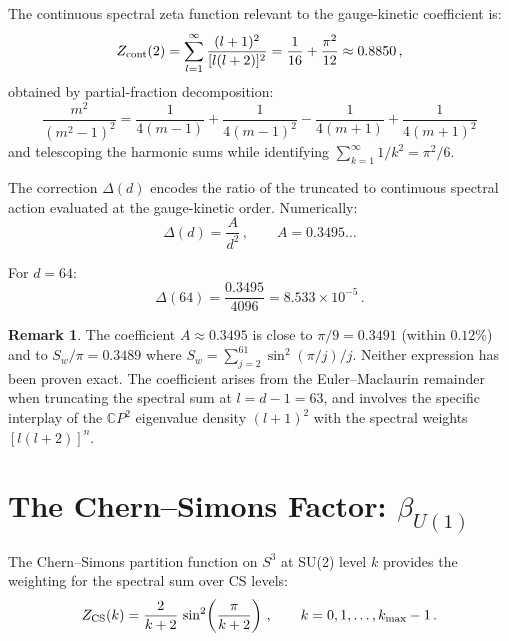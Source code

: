 \documentclass[12pt,a4paper]{article}
\theoremstyle{definition}
\newtheorem{remark}{Remark}
\begin{document}
The continuous spectral zeta function relevant to the gauge-kinetic coefficient
is:
\begin{equation}
Z_{\rm cont}(2) = \sum_{l=1}^{\infty}\frac{(l+1)^2}{[l(l+2)]^2}
= \frac{1}{16} + \frac{\pi^2}{12} \approx 0.8850\,,
\end{equation}
obtained by partial-fraction decomposition:
\begin{equation}
\frac{m^2}{(m^2-1)^2} = \frac{1}{4(m-1)} + \frac{1}{4(m-1)^2}
- \frac{1}{4(m+1)} + \frac{1}{4(m+1)^2}
\end{equation}
and telescoping the harmonic sums while identifying
$\sum_{k=1}^{\infty} 1/k^2 = \pi^2/6$.

The correction $\Delta(d)$ encodes the ratio of the truncated to
continuous spectral action evaluated at the gauge-kinetic order.
Numerically:
\begin{equation}
\Delta(d) = \frac{A}{d^2}\,,\qquad A = 0.3495\ldots
\end{equation}

For $d = 64$:
\begin{equation}
\Delta(64) = \frac{0.3495}{4096} = 8.533 \times 10^{-5}\,.
\end{equation}

\begin{remark}
The coefficient $A \approx 0.3495$ is close to $\pi/9 = 0.3491$
(within $0.12\%$) and to $S_w/\pi = 0.3489$ where $S_w = \sum_{j=2}^{61}
\sin^2(\pi/j)/j$.  Neither expression has been proven exact.
The coefficient arises from the Euler--Maclaurin remainder when
truncating the spectral sum at $l = d - 1 = 63$, and involves
the specific interplay of the $\mathbb{C}P^2$ eigenvalue density
$(l+1)^2$ with the spectral weights $[l(l+2)]^n$.
\end{remark}

\section{The Chern--Simons Factor: $\beta_{U(1)}$}
\label{sec:beta}

The Chern--Simons partition function on $S^3$ at SU(2) level $k$ provides
the weighting for the spectral sum over CS levels:
\begin{equation}
Z_{\rm CS}(k) = \frac{2}{k+2}\,\sin^2\!\left(\frac{\pi}{k+2}\right)\,,
\qquad k = 0, 1, \ldots, k_{\max}-1\,.
\end{equation}
\end{document}
